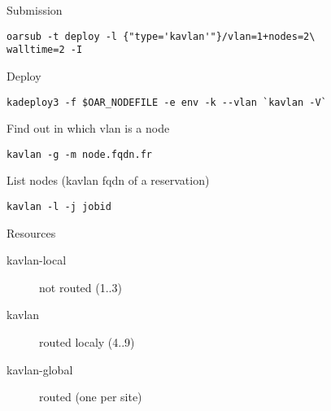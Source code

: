 Submission
\begin{lstlisting}
oarsub -t deploy -l {"type='kavlan'"}/vlan=1+nodes=2\
walltime=2 -I
\end{lstlisting}

Deploy
\begin{lstlisting}
kadeploy3 -f $OAR_NODEFILE -e env -k --vlan `kavlan -V`
\end{lstlisting}

Find out in which vlan is a node
\begin{lstlisting}
kavlan -g -m node.fqdn.fr
\end{lstlisting}

List nodes (kavlan fqdn of a reservation)
\begin{lstlisting}
kavlan -l -j jobid
\end{lstlisting}

Resources
\begin{description}
\item[kavlan-local] not routed (1..3)
\item[kavlan] routed localy (4..9)
\item[kavlan-global] routed (one per site)
\end{description}